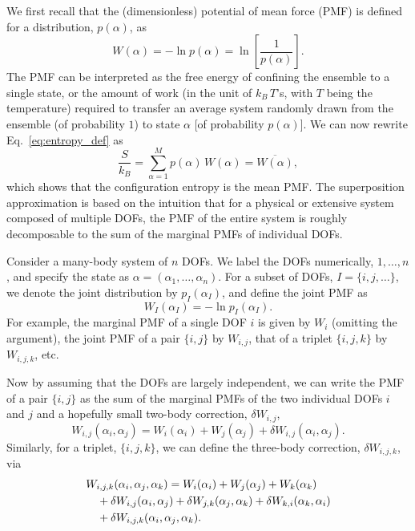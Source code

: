 \documentclass[reprint, superscriptaddress]{revtex4-1}
\begin{document}
We first recall that the (dimensionless) potential of mean force (PMF)
is defined for a distribution, $p(\alpha)$,
as
$$
W(\alpha) = -\ln p(\alpha) = \ln\left[ \frac{1}{p(\alpha)} \right].
$$
The PMF can be interpreted as
the free energy of confining the ensemble to a single state,
or the amount of work
(in the unit of $k_B \, T$'s, with $T$ being the temperature)
required to transfer an average system randomly drawn from the ensemble (of probability $1$)
to state $\alpha$ [of probability $p(\alpha)$].
%
We can now rewrite Eq.~\eqref{eq:entropy_def} as
%
\begin{equation}
  \frac{S}{k_B}
  =
  \sum_{\alpha = 1}^M p(\alpha) \, W(\alpha)
  =
  \overline{ W(\alpha) }
  ,
  \label{eq:S_W}
\end{equation}
%
which shows that the configuration entropy
is the mean PMF.
%
The superposition approximation is based on the intuition
that for a physical or extensive system composed of multiple DOFs,
the PMF of the entire system is roughly decomposable to
the sum of the marginal PMFs of individual DOFs.

Consider a many-body system of $n$ DOFs.
%
We label the DOFs numerically, $1, \dots, n$,
and specify the state as $\alpha = (\alpha_1, \dots, \alpha_n)$.
%
%
For a subset of DOFs, $I = \{i, j, \dots\}$,
we denote the joint distribution by $p_I(\alpha_I)$,
and define the joint PMF as
%
\begin{equation}
  W_I(\alpha_I) = -\ln p_I(\alpha_I)
  .
  \label{eq:WI_def}
\end{equation}
%
For example,
the marginal PMF of a single DOF $i$ is given by $W_i$ (omitting the argument),
the joint PMF of a pair $\{i, j\}$ by $W_{i, j}$,
that of a triplet $\{i, j, k\}$ by $W_{i, j, k}$, etc.

Now by assuming that the DOFs are largely independent,
we can write the PMF of a pair $\{i, j\}$
as the sum of the marginal PMFs of the two individual DOFs $i$ and $j$
and a hopefully small two-body correction, $\delta W_{i,j}$,
%
\begin{equation}
  W_{i,j}(\alpha_i, \alpha_j)
  =
  W_i(\alpha_i) + W_j(\alpha_j)
  + \delta W_{i,j}(\alpha_i, \alpha_j)
  .
  \label{eq:W_ij}
\end{equation}
%
Similarly, for a triplet, $\{i, j, k\}$,
we can define the three-body correction, $\delta W_{i,j,k}$, via
%
\begin{align}
  &W_{i,j,k}(\alpha_i, \alpha_j, \alpha_k)
  =
  W_i(\alpha_i) + W_j(\alpha_j) + W_k(\alpha_k)
  \notag \\
  &\quad
  + \delta W_{i,j}(\alpha_i, \alpha_j)
  + \delta W_{j,k}(\alpha_j, \alpha_k)
  + \delta W_{k,i}(\alpha_k, \alpha_i)
  \notag \\
  &\quad
  + \delta W_{i,j,k}(\alpha_i, \alpha_j, \alpha_k)
  .
  \label{eq:W_ijk}
\end{align}
%
\end{document}
